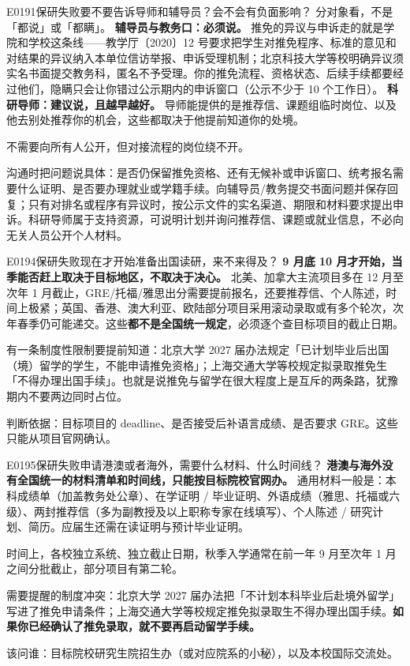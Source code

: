 \begin{qa}{E0191}{保研失败要不要告诉导师和辅导员？会不会有负面影响？}
分对象看，不是「都说」或「都瞒」。
\textbf{辅导员与教务口：必须说。} 推免的异议与申诉走的就是学院和学校这条线——教学厅〔2020〕12 号要求把学生对推免程序、标准的意见和对结果的异议纳入本单位信访举报、申诉受理机制；北京科技大学等校明确异议须实名书面提交教务科，匿名不予受理。你的推免流程、资格状态、后续手续都要经过他们，隐瞒只会让你错过公示期内的申诉窗口（公示不少于 10 个工作日）。
\textbf{科研导师：建议说，且越早越好。} 导师能提供的是推荐信、课题组临时岗位、以及他去别处推荐你的机会，这些都取决于他提前知道你的处境。

不需要向所有人公开，但对接流程的岗位绕不开。

沟通时把问题说具体：是否仍保留推免资格、还有无候补或申诉窗口、统考报名需要什么证明、是否要办理就业或学籍手续。向辅导员/教务提交书面问题并保存回复；只有对排名或程序有异议时，按公示文件的实名渠道、期限和材料要求提出申诉。科研导师属于支持资源，可说明计划并询问推荐信、课题或就业信息，不必向无关人员公开个人材料。
\end{qa}

\begin{qa}{E0194}{保研失败现在才开始准备出国读研，来不来得及？}
\textbf{9 月底 10 月才开始，当季能否赶上取决于目标地区，不取决于决心。}
北美、加拿大主流项目多在 12 月至次年 1 月截止，GRE/托福/雅思出分需要提前报名，还要推荐信、个人陈述，时间上极紧；英国、香港、澳大利亚、欧陆部分项目采用滚动录取或有多个轮次，次年春季仍可能递交。这些\textbf{都不是全国统一规定}，必须逐个查目标项目的截止日期。

有一条制度性限制要提前知道：北京大学 2027 届办法规定「已计划毕业后出国（境）留学的学生，不能申请推免资格」；上海交通大学等校规定拟录取推免生「不得办理出国手续」。也就是说推免与留学在很大程度上是互斥的两条路，犹豫期内不要两边同时占位。

判断依据：目标项目的 deadline、是否接受后补语言成绩、是否要求 GRE。这些只能从项目官网确认。
\end{qa}

\begin{qa}{E0195}{保研失败申请港澳或者海外，需要什么材料、什么时间线？}
\textbf{港澳与海外没有全国统一的材料清单和时间线，只能按目标院校官网办。}
通用材料一般是：本科成绩单（加盖教务处公章）、在学证明 / 毕业证明、外语成绩（雅思、托福或六级）、两封推荐信（多为副教授及以上职称专家在线填写）、个人陈述 / 研究计划、简历。应届生还需在读证明与预计毕业证明。

时间上，各校独立系统、独立截止日期，秋季入学通常在前一年 9 月至次年 1 月之间分批截止，部分项目有第二轮。

需要提醒的制度冲突：北京大学 2027 届办法把「不计划本科毕业后赴境外留学」写进了推免申请条件；上海交通大学等校规定推免拟录取生不得办理出国手续。\textbf{如果你已经确认了推免录取，就不要再启动留学手续。}

该问谁：目标院校研究生院招生办（或对应院系的小秘），以及本校国际交流处。
\end{qa}

